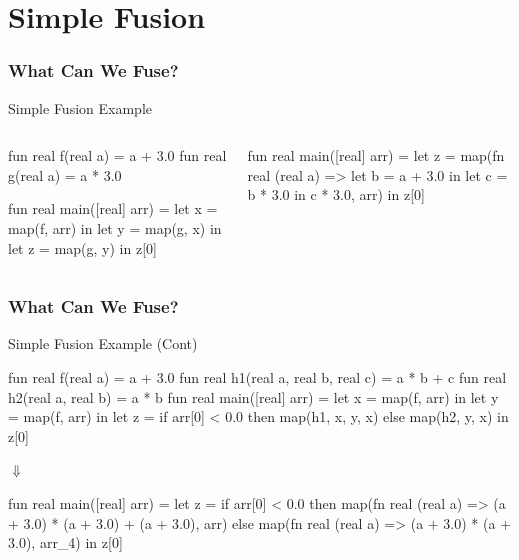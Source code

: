 \documentclass{beamer}
\begin{document}
\section{Simple Fusion}

\begin{frame}[fragile,t]
  \frametitle{What Can We Fuse?}

  \begin{block}{Simple Fusion Example}\vspace{-1ex}
    \begin{columns}
      \vspace{-1ex}
      \begin{colorcode}[fontsize=\scriptsize]
fun real f(real a) = a + 3.0
fun real g(real a) = a * 3.0

fun real main([real] arr) =
  let x = map(f, arr) in
  let y = map(g, x)   in
  let z = map(g, y)   in
  z[0]
      \end{colorcode}
      \begin{colorcode}[fontsize=\scriptsize]
fun real main([real] arr) =
  let z = map(fn real (real a) =>
                let b = a + 3.0 in
                let c = b * 3.0 in
                c * 3.0, arr) in
  z[0]
      \end{colorcode}
    \end{columns}
  \end{block}

\end{frame}
\begin{frame}[fragile,t]
  \frametitle{What Can We Fuse?}
  \begin{block}{Simple Fusion Example (Cont)}
\begin{center}
    \begin{colorcode}[fontsize=\scriptsize]
fun real f(real a) = a + 3.0
fun real h1(real a, real b, real c) = a * b + c
fun real h2(real a, real b) = a * b
fun real main([real] arr) =
  let x = map(f, arr) in
  let y = map(f, arr) in
  let z = if arr[0] < 0.0
            then map(h1, x, y, x)
            else map(h2, y, x) in
  z[0]
    \end{colorcode}
$\Downarrow$
    \begin{colorcode}
fun real main([real] arr) =
  let z =
    if arr[0] < 0.0 then
      map(fn real (real a) => (a + 3.0) * (a + 3.0) + (a + 3.0), arr)
    else map(fn real (real a) => (a + 3.0) * (a + 3.0), arr_4)
  in z[0]
    \end{colorcode}
\end{center}
  \end{block}
\end{frame}
\end{document}
